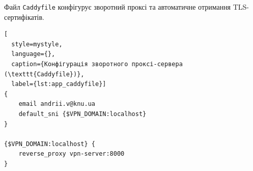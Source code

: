 
Файл \texttt{Caddyfile} конфігурує зворотний проксі та автоматичне отримання
TLS-сертифікатів.

\begin{lstlisting}[
  style=mystyle,
  language={},
  caption={Конфігурація зворотного проксі-сервера (\texttt{Caddyfile})},
  label={lst:app_caddyfile}]
{
    email andrii.v@knu.ua
    default_sni {$VPN_DOMAIN:localhost}
}

{$VPN_DOMAIN:localhost} {
    reverse_proxy vpn-server:8000
}
\end{lstlisting}

\newpage
